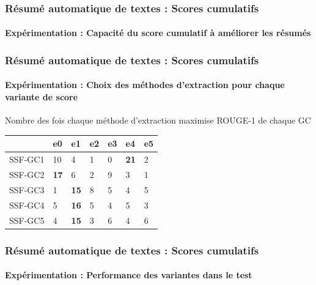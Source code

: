 \documentclass[xcolor=table]{beamer}
\begin{document}
\begin{frame}
\frametitle{Résumé automatique de textes : Scores cumulatifs}
\framesubtitle{Expérimentation : Capacité du score cumulatif à améliorer les résumés}
	
\begin{center}
\end{center}
	
\end{frame}

\begin{frame}
\frametitle{Résumé automatique de textes : Scores cumulatifs}
\framesubtitle{Expérimentation : Choix des méthodes d'extraction pour chaque variante de score}
	
\begin{block}{Nombre des fois chaque méthode d'extraction maximise ROUGE-1 de chaque GC}
	\centering
	\begin{tabular}{lllllll}
		\hline\hline
		& e0 & e1 & e2 & e3 & e4 & e5 \\
		\hline
		SSF-GC1 & 10 & 4 & 1 & 0 & \textbf{21} & 2 \\
		SSF-GC2 & \textbf{17} & 6 & 2 & 9 & 3 & 1 \\
		SSF-GC3 & 1 & \textbf{15} & 8 & 5 & 4 & 5 \\
		SSF-GC4 & 5 & \textbf{16} & 5 & 4 & 5 & 3 \\
		SSF-GC5 & 4 & \textbf{15} & 3 & 6 & 4 & 6 \\
		\hline\hline
	\end{tabular}  
\end{block}
	
\end{frame}

\begin{frame}
\frametitle{Résumé automatique de textes : Scores cumulatifs}
\framesubtitle{Expérimentation : Performance des variantes dans le test}
	
	
\end{frame}
\end{document}
